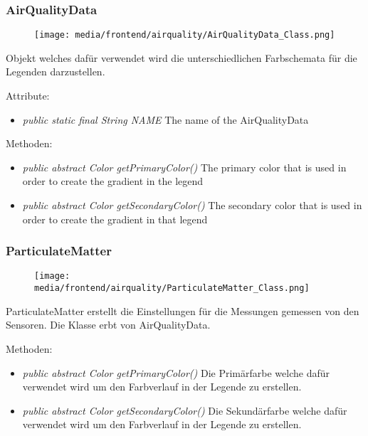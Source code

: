 \subsubsection{AirQualityData}
\begin{minipage}{0.3\textwidth}
    \begin{figure}[H]
        \texttt{[image: media/frontend/airquality/AirQualityData\_Class.png]}
    \end{figure}
    \end{minipage} \hfill
    \begin{minipage}{0.6\textwidth}
Objekt welches dafür verwendet wird die unterschiedlichen Farbschemata für die Legenden darzustellen.
\end{minipage}

Attribute:
\begin{itemize} 
    \item \emph{public static final String NAME} The name of the AirQualityData
\end{itemize}
Methoden:
\begin{itemize} 
    \item \emph{public abstract Color getPrimaryColor()} The primary color that is used in order to create the gradient in the legend
    \item \emph{public abstract Color getSecondaryColor()} The secondary color that is used in order to create the gradient in that legend
\end{itemize}

\subsubsection{ParticulateMatter}
\begin{minipage}{0.3\textwidth}
    \begin{figure}[H]
        \texttt{[image: media/frontend/airquality/ParticulateMatter\_Class.png]}
    \end{figure}
    \end{minipage} \hfill
    \begin{minipage}{0.6\textwidth}
ParticulateMatter erstellt die Einstellungen für die Messungen gemessen von den Sensoren. Die Klasse erbt von AirQualityData.
\end{minipage}

Methoden:
\begin{itemize} 
	\item \emph{public abstract Color getPrimaryColor()} Die Primärfarbe welche dafür verwendet wird um den Farbverlauf in der Legende zu erstellen.
	\item \emph{public abstract Color getSecondaryColor()} Die Sekundärfarbe welche dafür verwendet wird um den Farbverlauf in der Legende zu erstellen.
\end{itemize}

